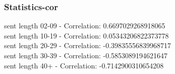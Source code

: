 \documentclass{article}%
\begin{document}
%
\newpage%
\subsubsection{Statistics{-}cor}%
\label{ssubsec:Statistics{-}cor}%
\noindent%
sent length 02-09 - Correlation: 0.6697029268918065\\%
sent length 10-19 - Correlation: 0.05343206822373778\\%
sent length 20-29 - Correlation: -0.39835556839968717\\%
sent length 30-39 - Correlation: -0.5853089194621647\\%
sent length 40+ - Correlation: -0.7142900310654208\\

%
\newpage

%
\end{document}
